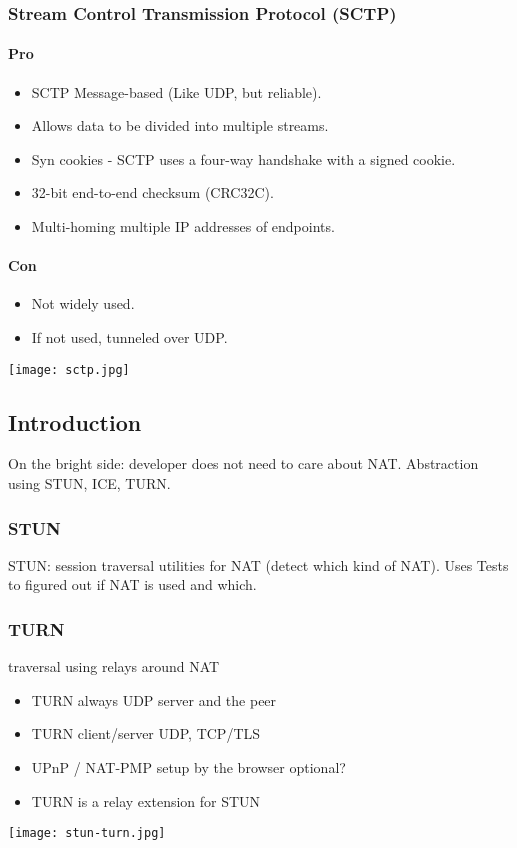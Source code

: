 \subsubsection{Stream Control Transmission Protocol (SCTP)}
\paragraph{Pro}
\begin{itemize}
  \item SCTP Message-based (Like UDP, but reliable).
  \item Allows data to be divided into multiple streams.
  \item Syn cookies - SCTP uses a four-way handshake with a signed cookie.
  \item 32-bit end-to-end checksum (CRC32C).
  \item Multi-homing multiple IP addresses of endpoints.
\end{itemize}
\paragraph{Con}
\begin{itemize}
  \item Not widely used.
  \item If not used, tunneled over UDP.
\end{itemize}
\texttt{[image: sctp.jpg]}

\subsection{Introduction}
On the bright side: developer does not need to care about NAT.
Abstraction using STUN, ICE, TURN.

\subsubsection{STUN}
STUN: session traversal utilities for NAT (detect which kind of NAT).
Uses Tests to figured out if NAT is used and which.

\subsubsection{TURN}
traversal using relays around NAT
\begin{itemize}
  \item TURN always UDP server and the peer
  \item TURN client/server UDP, TCP/TLS
  \item UPnP / NAT-PMP setup by the browser optional?
  \item TURN is a relay extension for STUN
\end{itemize}
\texttt{[image: stun-turn.jpg]}

